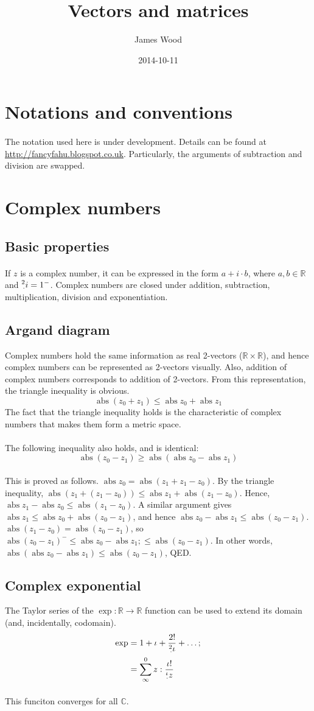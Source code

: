 \documentclass[11pt]{article}
\title{\textbf{Vectors and matrices}}
\author{James Wood}
\date{2014-10-11}
\newcommand*\C{\ensuremath{\mathbb C}}
\newcommand*\R{\ensuremath{\mathbb R}}
\newcommand*\id{\iota}
\newcommand*\cd{\cdot}
\newcommand*\prg{\paragraph}
\newcommand*\pt{\prescript}
\DeclareMathOperator{\abs}{abs}
\begin{document}
\maketitle

\section*{Notations and conventions}
\prg{}The notation used here is under development. Details can be found at \url{http://fancyfahu.blogspot.co.uk}. Particularly, the arguments of subtraction and division are swapped.

\section{Complex numbers}
\subsection{Basic properties}
\prg{}If $z$ is a complex number, it can be expressed in the form $a+i\cd b$, where $a,b\in\mathbb R$ and $\pt 2 \cd i=1^-$. Complex numbers are closed under addition, subtraction, multiplication, division and exponentiation.

\subsection{Argand diagram}
Complex numbers hold the same information as real 2-vectors ($\R\times\R$), and hence complex numbers can be represented as 2-vectors visually. Also, addition of complex numbers corresponds to addition of 2-vectors. From this representation, the triangle inequality is obvious.
$$
\abs(z_0+z_1)\leq\abs z_0+\abs z_1
$$
The fact that the triangle inequality holds is the characteristic of complex numbers that makes them form a metric space.

\prg{}The following inequality also holds, and is identical:
$$
\abs(z_0-z_1)\geq\abs(\abs z_0-\abs z_1)
$$
\prg{}This is proved as follows. $\abs z_0=\abs(z_1+z_1-z_0)$. By the triangle inequality,
$\abs(z_1+(z_1-z_0))\leq\abs z_1+\abs(z_1-z_0)$. Hence, $\abs z_1-\abs z_0\leq\abs(z_1-z_0)$. A similar argument gives $\abs z_1\leq\abs z_0+\abs(z_0-z_1)$, and hence $\abs z_0-\abs z_1\leq\abs(z_0-z_1)$. $\abs(z_1-z_0)=\abs(z_0-z_1)$, so
$\abs(z_0-z_1)^-\leq\abs z_0-\abs z_1;\leq\abs(z_0-z_1)$. In other words, $\abs(\abs z_0-\abs z_1)\leq\abs(z_0-z_1)$, QED.

\subsection{Complex exponential}
The Taylor series of the $\exp:\R\rightarrow\R$ function can be used to extend its domain (and, incidentally, codomain).
\[
\begin{aligned}
\exp&=1+\id+\frac{2!}{\pt 2\cd\id}+\hdots; \\
    &=\sum^0_\infty z:\frac{\id!}{\pt\id\cd z}
\end{aligned}
\]
\prg{}This funciton converges for all $\C$.
\end{document}
